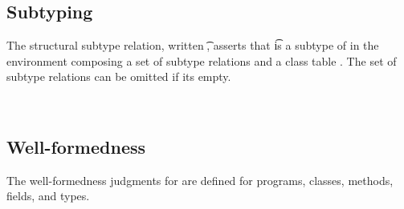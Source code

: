 \documentclass[acmlarge, anonymous, authordraft]{acmart}
\begin{document}

\subsection{Subtyping}

The structural subtype relation, written \StrSub\M\K\t\tp, asserts that \t
is a subtype of \tp in the environment \M composing a set of subtype relations and
a class table \K.   The set of subtype relations can be omitted if its empty.

~\\

\begin{mathpar}


\end{mathpar}

\begin{mathpar}


\end{mathpar}

\subsection{Well-formedness}

The well-formedness judgments for \kafka are defined for programs, classes, methods, fields, and types.

~\\


\begin{mathpar}
\end{mathpar}
\end{document}
